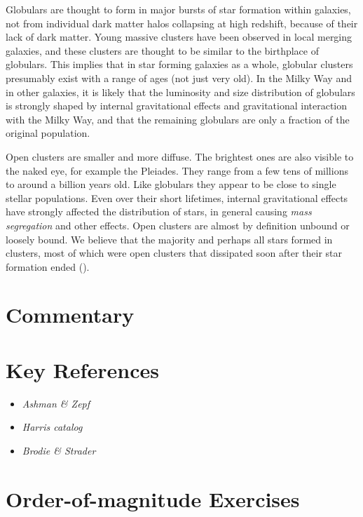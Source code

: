 Globulars are thought to form in major bursts of star formation within
galaxies, not from individual dark matter halos collapsing at high
redshift, because of their lack of dark matter. Young massive clusters
have been observed in local merging galaxies, and these clusters are
thought to be similar to the birthplace of globulars. This implies
that in star forming galaxies as a whole, globular clusters presumably
exist with a range of ages (not just very old).  In the Milky Way and
in other galaxies, it is likely that the luminosity and size
distribution of globulars is strongly shaped by internal
gravitational effects and gravitational interaction with the Milky
Way, and that the remaining globulars are only a fraction of the
original population.

Open clusters are smaller and more diffuse. The brightest ones are
also visible to the naked eye, for example the Pleiades. They range
from a few tens of millions to around a billion years old. Like
globulars they appear to be close to single stellar populations. Even
over their short lifetimes, internal gravitational effects have
strongly affected the distribution of stars, in general causing {\it
mass segregation} and other effects. Open clusters are almost by
definition unbound or loosely bound. We believe that the majority and
perhaps all stars formed in clusters, most of which were open clusters
that dissipated soon after their star formation ended
(\citealt{lada03a}).

\section{Commentary}

\section{Key References}

\begin{itemize}
  \item
    {\it Ashman \& Zepf}
  \item
    {\it Harris catalog}
  \item
    {\it Brodie \& Strader}
\end{itemize}

\citet{gunn06a}

\section{Order-of-magnitude Exercises}


